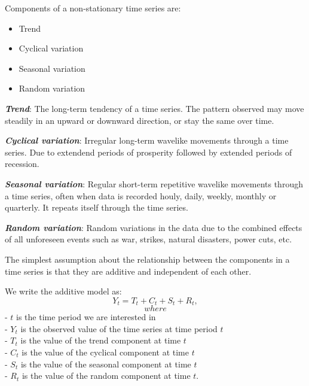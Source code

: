 \documentclass[a4paper, 10pt, fleqn]{article}
\begin{document}
\begin{flushleft}
      \vspace{1em}

      Components of a non-stationary time series are:
      \begin{itemize}
         \item Trend
         \item Cyclical variation
         \item Seasonal variation
         \item Random variation
      \end{itemize}

      \vspace{1em}

      \textbf{\textit{Trend}}: The long-term tendency of a time series. The pattern observed may move steadily in an upward or downward direction, or stay the same over time.

      \vspace{1em}

      \textbf{\textit{Cyclical variation}}: Irregular long-term wavelike movements through a time series. Due to extendend periods of prosperity followed by extended periods of recession.

      \vspace{1em}

      \textbf{\textit{Seasonal variation}}: Regular short-term repetitive wavelike movements through a time series, often when data is recorded houly, daily, weekly, monthly or quarterly. It repeats itself through the time series.

      \vspace{1em}

      \textbf{\textit{Random variation}}: Random variations in the data due to the combined effects of all unforeseen events such as war, strikes, natural disasters, power cuts, etc. 

      \vspace{1em}

      The simplest assumption about the relationship between the components in a time series is that they are additive and independent of each other.

      \vspace{1em}

      We write the additive model as: $$Y_{t} = T_{t} + C_{t} + S_{t} + R_{t},$$
      $$where$$
      - $t$ is the time period we are interested in\\
      - $Y_{t}$ is the observed value of the time series at time period $t$\\
      - $T_{t}$ is the value of the trend component at time $t$\\
      - $C_{t}$ is the value of the cyclical component at time $t$\\
      - $S_{t}$ is the value of the seasonal component at time $t$\\
      - $R_{t}$ is the value of the random component at time $t$.


\end{flushleft}
\end{document}
